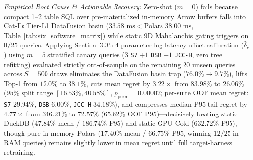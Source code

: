 \documentclass[10pt,a4paper]{article}
\begin{document}
\begin{table}[!htbp]
\centering
\caption{Empirical per-suite zero-shot failure breakdown ($m=0$) and strictly out-of-sample $m=5$ stratified canary calibration recovery ($S=500$ draws evaluated on $N_{\text{eval}}=20$ disjoint unseen queries/draw; CSV SHA-256 \texttt{83c393612e5e7ed7...}) across the 25-query prospective suite.}
\label{tab:prospective_3suite_failure}
\scriptsize
{}
\vspace{2pt}
\parbox{\textwidth}{\scriptsize \textit{Empirical Root Cause \& Actionable Recovery:} Zero-shot ($m=0$) fails because compact 1--2 table SQL over pre-materialized in-memory Arrow buffers falls into Cat-I's Tier-L1 DataFusion basin ($33.58\text{ ms} < \text{Polars } 38.00\text{ ms}$, Table~\ref{tab:six_software_matrix}) while static 9D Mahalanobis gating triggers on $0/25$ queries. Applying Section~3.3's 4-parameter log-latency offset calibration ($\hat{\delta}_e$) using $m=5$ stratified canary queries ($3$ \texttt{S7} $+ 1$ \texttt{DSB} $+ 1$ \texttt{JCC-H}, zero tree refitting) evaluated strictly out-of-sample on the remaining $20$ unseen queries across $S=500$ draws eliminates the DataFusion basin trap ($76.0\% \rightarrow 9.7\%$), lifts Top-1 from $12.0\%$ to $38.1\%$, cuts mean regret by $3.22\times$ from $83.98\%$ to $26.06\%$ (95\% split range $[16.53\%, 40.58\%]$, $p_{\text{perm}}=0.00002$; per-suite OOF mean regret: \texttt{S7} $29.94\%$, \texttt{DSB} $6.00\%$, \texttt{JCC-H} $34.18\%$), and compresses median P95 tail regret by $4.77\times$ from $346.21\%$ to $72.57\%$ ($65.82\%$ OOF P95)---decisively beating static DuckDB ($47.84\%$ mean / $186.74\%$ P95) and static GPU Cold ($632.72\%$ P95), though pure in-memory Polars ($17.40\%$ mean / $66.75\%$ P95, winning $12/25$ in-RAM queries) remains slightly lower in mean regret until full target-harness retraining.}
\end{table}
\end{document}

